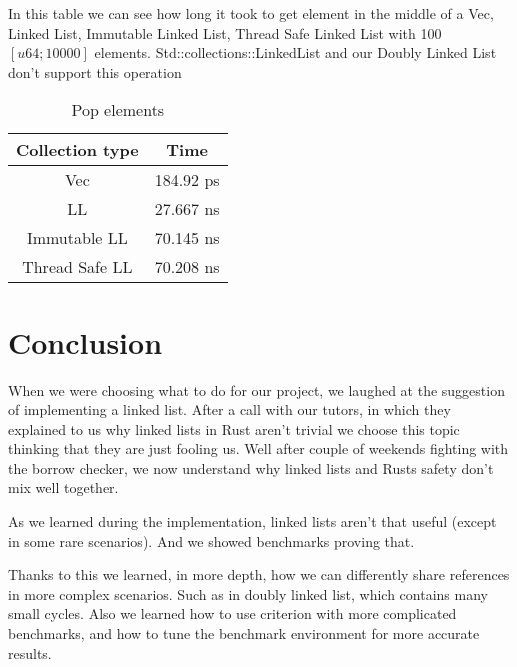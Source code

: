\documentclass[11pt,twoside,a4paper]{article}
\begin{document}
In this table we can see how long it took to get element in the middle of a Vec,\\
Linked List, Immutable Linked List, Thread Safe Linked List with 100
$[u64; 10000]$ elements. Std::collections::LinkedList and our Doubly Linked List
don't support this operation
\begin{table}[!h]
      \begin{center}
            \caption{Pop elements}
            \begin{tabular}{|c|c|}
                  \hline
                  Collection type & Time      \\
                  \hline
                  Vec             & 184.92 ps \\
                  LL              & 27.667 ns \\
                  Immutable LL    & 70.145 ns \\
                  Thread Safe LL  & 70.208 ns \\
                  \hline
            \end{tabular}
      \end{center}
\end{table}

\section{Conclusion}

When we were choosing what to do for our project, we laughed at the suggestion
of implementing a linked list. After a call with our tutors, in which they
explained to us why linked lists in Rust aren't trivial we choose this topic
thinking that they are just fooling us. Well after couple of weekends fighting
with the borrow checker, we now understand why linked lists and Rusts safety
don't mix well together.

As we learned during the implementation, linked lists aren't that useful (except in some
rare scenarios). And we showed benchmarks proving that.

Thanks to this we learned, in more depth, how we can differently share references
in more complex scenarios. Such as in doubly linked list, which contains many
small cycles. Also we learned how to use criterion with more complicated benchmarks,
and how to tune the benchmark environment for more accurate results.



\end{document}
